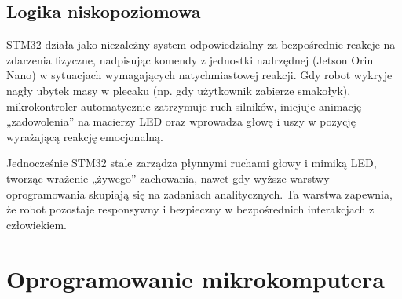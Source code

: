 \documentclass{article}
\begin{document}
        \subsection*{Logika niskopoziomowa}
            STM32 działa jako niezależny system odpowiedzialny za bezpośrednie reakcje na zdarzenia fizyczne,
            nadpisując komendy z jednostki nadrzędnej (Jetson Orin Nano) w sytuacjach wymagających natychmiastowej reakcji.
            Gdy robot wykryje nagły ubytek masy w plecaku (np. gdy użytkownik zabierze smakołyk),
            mikrokontroler automatycznie zatrzymuje ruch silników, inicjuje animację „zadowolenia” na macierzy LED
            oraz wprowadza głowę i uszy w pozycję wyrażającą reakcję emocjonalną.

            Jednocześnie STM32 stale zarządza płynnymi ruchami głowy i mimiką LED, tworząc wrażenie „żywego” zachowania,
            nawet gdy wyższe warstwy oprogramowania skupiają się na zadaniach analitycznych.
            Ta warstwa zapewnia, że robot pozostaje responsywny i bezpieczny w bezpośrednich interakcjach z człowiekiem.

    \pagebreak
    \section{Oprogramowanie mikrokomputera}
\end{document}
